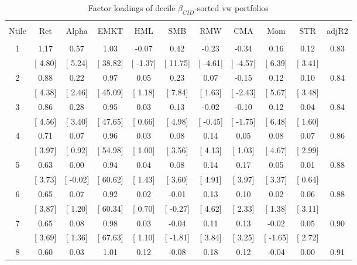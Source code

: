 \documentclass[16pt]{article}
\begin{document}
\begin{table}[!htbp] \centering 
  \caption{Factor loadings of decile $\beta_{CID}$-sorted vw portfolios} 
  \label{} 
\begin{tabular}{@{\extracolsep{5pt}} ccccccccccc} 
\\[-1.8ex]\hline 
\hline \\[-1.8ex] 
Ntile & Ret & Alpha & EMKT & HML & SMB & RMW & CMA & Mom & STR & adjR2 \\ 
\hline \\[-1.8ex] 
1 & 1.17 & 0.57 & 1.03 & -0.07 & 0.42 & -0.23 & -0.34 & 0.16 & 0.12 & 0.83 \\ 
 & [ 4.80] & [ 5.24] & [ 38.82] & [ -1.37] & [ 11.75] & [ -4.61] & [ -4.57] & [ 6.39] & [ 3.41] &  \\ 
2 & 0.88 & 0.22 & 0.97 & 0.05 & 0.23 & 0.07 & -0.15 & 0.12 & 0.10 & 0.84 \\ 
 & [ 4.38] & [ 2.46] & [ 45.09] & [ 1.18] & [ 7.84] & [ 1.63] & [ -2.43] & [ 5.67] & [ 3.48] &  \\ 
3 & 0.86 & 0.28 & 0.95 & 0.03 & 0.13 & -0.02 & -0.10 & 0.12 & 0.04 & 0.84 \\ 
 & [ 4.56] & [ 3.40] & [ 47.65] & [ 0.66] & [ 4.98] & [ -0.45] & [ -1.75] & [ 6.48] & [ 1.60] &  \\ 
4 & 0.71 & 0.07 & 0.96 & 0.03 & 0.08 & 0.14 & 0.05 & 0.08 & 0.07 & 0.86 \\ 
 & [ 3.97] & [ 0.92] & [ 54.98] & [ 1.00] & [ 3.56] & [ 4.13] & [ 1.03] & [ 4.67] & [ 2.99] &  \\ 
5 & 0.63 & 0.00 & 0.94 & 0.04 & 0.08 & 0.14 & 0.17 & 0.05 & 0.01 & 0.88 \\ 
 & [ 3.73] & [ -0.02] & [ 60.62] & [ 1.43] & [ 3.60] & [ 4.91] & [ 3.97] & [ 3.37] & [ 0.64] &  \\ 
6 & 0.65 & 0.07 & 0.92 & 0.02 & -0.01 & 0.13 & 0.10 & 0.02 & 0.06 & 0.88 \\ 
 & [ 3.87] & [ 1.20] & [ 60.34] & [ 0.70] & [ -0.27] & [ 4.62] & [ 2.33] & [ 1.38] & [ 3.11] &  \\ 
7 & 0.65 & 0.08 & 0.98 & 0.03 & -0.04 & 0.11 & 0.13 & -0.02 & 0.05 & 0.90 \\ 
 & [ 3.69] & [ 1.36] & [ 67.63] & [ 1.10] & [ -1.81] & [ 3.84] & [ 3.25] & [ -1.65] & [ 2.72] &  \\ 
8 & 0.60 & 0.03 & 1.01 & 0.12 & -0.08 & 0.18 & 0.12 & -0.04 & 0.00 & 0.91 \\ 

\end{tabular}
\end{table}
\end{document}

